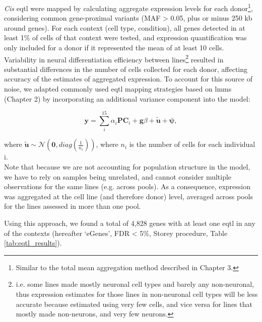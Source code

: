 \textit{Cis} \gls{eqtl} were mapped by calculating aggregate expression levels for each donor\footnote{Similar to the total mean aggregation method described in Chapter 3.}, considering common gene-proximal variants (MAF > 0.05, plus or minus 250 kb around genes). 
For
each context (cell type, condition), all genes detected in at least 1\% of cells of that context
were tested, and expression quantification was only included for a donor if it represented
the mean of at least 10 cells.
Variability in neural differentiation efficiency between lines\footnote{i.e. some lines made mostly neuronal cell types and barely any non-neuronal, thus expression estimates for those lines in non-neuronal cell types will be less accurate because estimated using very few cells, and vice versa for lines that mostly made non-neurons, and very few neurons.} resulted in substantial differences in the number of cells collected for each donor, affecting accuracy of the estimates of aggregated expression. 
To account for this source of noise, we adapted commonly used \gls{eqtl} mapping strategies \cite{cuomo2020single} based on \glspl{lmm} (Chapter
2) by incorporating an additional variance component into the model:

\begin{equation}\label{eq:neuroseq_ncell}
    \mathbf{y} = \sum_i^{15}\alpha_i \mathbf{PC}_i + \mathbf{g}\beta + \tilde{\mathbf{u}} + \boldsymbol{\psi}, 
\end{equation}

where $\tilde{\mathbf{u}} \sim \mathcal{N}(\mathbf{0}, diag(\frac{1}{n_i}))$, where $n_i$ is the number of cells for each individual i.\\

Note that because we are not accounting for population structure 
in the model, we have to rely on samples being unrelated, and cannot consider multiple observations for the same lines (e.g. across pools). 
As a consequence, expression was aggregated at the cell line (and therefore donor) level, averaged across pools for the lines assessed in more than one pool. 

\newpage

Using this approach, we found
a total of 4,828 genes with at least one \gls{eqtl} in any of the contexts (hereafter `eGenes', FDR < 5\%, Storey procedure, Table \ref{tab:eqtl_results}).

